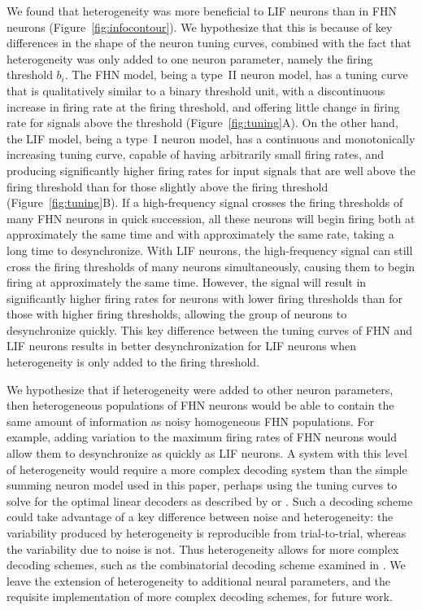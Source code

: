 \documentclass[12pt]{article}
\begin{document}
We found that heterogeneity was more beneficial to LIF neurons than in FHN neurons (Figure~\ref{fig:infocontour}). We hypothesize that this is because of key differences in the shape of the neuron tuning curves, combined with the fact that heterogeneity was only added to one neuron parameter, namely the firing threshold $b_i$. The FHN model, being a type~II neuron model, has a tuning curve that is qualitatively similar to a binary threshold unit, with a discontinuous increase in firing rate at the firing threshold, and offering little change in firing rate for signals above the threshold (Figure~\ref{fig:tuning}A). On the other hand, the LIF model, being a type~I neuron model, has a continuous and monotonically increasing tuning curve, capable of having arbitrarily small firing rates, and producing significantly higher firing rates for input signals that are well above the firing threshold than for those slightly above the firing threshold (Figure~\ref{fig:tuning}B). If a high-frequency signal crosses the firing thresholds of many FHN neurons in quick succession, all these neurons will begin firing both at approximately the same time and with approximately the same rate, taking a long time to desynchronize. With LIF neurons, the high-frequency signal can still cross the firing thresholds of many neurons simultaneously, causing them to begin firing at approximately the same time. However, the signal will result in significantly higher firing rates for neurons with lower firing thresholds than for those with higher firing thresholds, allowing the group of neurons to desynchronize quickly. This key difference between the tuning curves of FHN and LIF neurons results in better desynchronization for LIF neurons when heterogeneity is only added to the firing threshold.

We hypothesize that if heterogeneity were added to other neuron parameters, then heterogeneous populations of FHN neurons would be able to contain the same amount of information as noisy homogeneous FHN populations. For example, adding variation to the maximum firing rates of FHN neurons would allow them to desynchronize as quickly as LIF neurons. A system with this level of heterogeneity would require a more complex decoding system than the simple summing neuron model used in this paper, perhaps using the tuning curves to solve for the optimal linear decoders as described by \cite{Salinas1994} or \cite{Eliasmith2003}. Such a decoding scheme could take advantage of a key difference between noise and heterogeneity: the variability produced by heterogeneity is reproducible from trial-to-trial, whereas the variability due to noise is not. Thus heterogeneity allows for more complex decoding schemes, such as the combinatorial decoding scheme examined in \cite{Osborne2008}. We leave the extension of heterogeneity to additional neural parameters, and the requisite implementation of more complex decoding schemes, for future work.
\end{document}
